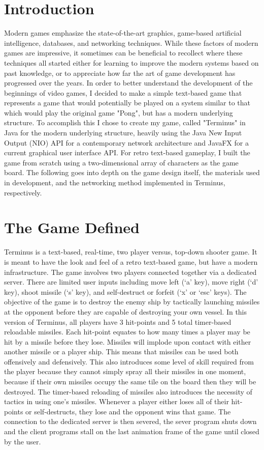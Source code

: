 \documentclass[12pt]{article}
\begin{document}
\section{Introduction}
    Modern games emphasize the state-of-the-art graphics, game-based artificial intelligence, databases, and networking techniques. While these factors of modern games are impressive, it sometimes can be beneficial to recollect where these techniques all started either for learning to improve the modern systems based on past knowledge, or to appreciate how far the art of game development has progressed over the years. In order to better understand the development of the beginnings of video games, I decided to make a simple text-based game that represents a game that would potentially be played on a system similar to that which would play the original game "Pong", but has a modern underlying structure. To accomplish this I chose to create my game, called "Terminus" in Java for the modern underlying structure, heavily using the Java New Input Output (NIO) API for a contemporary network architecture and JavaFX for a current graphical user interface API. For retro text-based gameplay, I built the game from scratch using a two-dimensional array of characters as the game board. The following goes into depth on the game design itself, the materials used in development, and the networking method implemented in Terminus, respectively.
    
\section{The Game Defined}
    Terminus is a text-based, real-time, two player versus, top-down shooter game. It is meant to have the look and feel of a retro text-based game, but have a modern infrastructure. The game involves two players connected together via a dedicated server. There are limited user inputs including move left (`a' key), move right (`d' key), shoot missile (`s' key), and self-destruct or forfeit (`x' or `esc' keys). The objective of the game is to destroy the enemy ship by tactically launching missiles at the opponent before they are capable of destroying your own vessel. In this version of Terminus, all players have 3 hit-points and 5 total timer-based reloadable missiles. Each hit-point equates to how many times a player may be hit by a missile before they lose. Missiles will implode upon contact with either another missile or a player ship. This means that missiles can be used both offensively and defensively. This also introduces some level of skill required from the player because they cannot simply spray all their missiles in one moment, because if their own missiles occupy the same tile on the board then they will be destroyed. The timer-based reloading of missiles also introduces the necessity of tactics in using one's missiles. Whenever a player either loses all of their hit-points or self-destructs, they lose and the opponent wins that game. The connection to the dedicated server is then severed, the sever program shuts down and the client programs stall on the last animation frame of the game until closed by the user.
    
\end{document}
